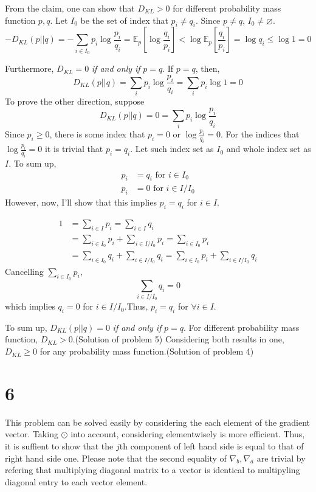 \documentclass[10pt]{article}
\begin{document}
From the claim, one can show that $D_{KL}>0$ for different probability mass function $p, q$. Let $I_0$ be the set of index that $p_i \neq q_i$. Since $p\neq q$, $I_0 \neq \varnothing$.
\begin{equation}
    -D_{KL}(p||q) = -\sum_{i\in I_0} p_i\log{\frac{p_i}{q_i}} = \mathbb{E}_{p}\left[\log{\frac{q_i}{p_i}}\right] < \log{\mathbb{E}_p\left[\frac{q_i}{p_i}\right]} = \log q_i \le \log 1 = 0 
    \label{eqn8}
\end{equation}

Furthermore, $D_{KL}=0$ \textit{if and only if} $p = q$. If $p=q$, then, 
\begin{equation}
    D_{KL}(p||q) = \sum_i p_i \log{\frac{p_i}{q_i}} = \sum_i p_i \log{1} = 0
\end{equation}
To prove the other direction, suppose
\begin{equation}
    D_{KL}(p||q) = 0 = \sum_i p_i \log{\frac{p_i}{q_i}}
\end{equation}
Since $p_i\ge 0$, there is some index that $p_i = 0$ or $\log{\frac{p_i}{q_i}} = 0$. For the indices that $\log{\frac{p_i}{q_i}} = 0$
it is trivial that $p_i = q_i$. Let such index set as $I_0$ and whole index set as $I$. To sum up,
\begin{align*}
    p_i &= q_i \text{ for } i \in I_0 \\
    p_i &= 0 \text{ for } i \in I/I_0
\end{align*}
However, now, I'll show that this implies $p_i = q_i$ for $i \in I$.

\begin{align*}
    1 &= \sum_{i\in I } p_i = \sum_{i\in I}q_i \\
    &= \sum_{i\in I_0} p_i + \sum_{i \in I/I_0} p_i = \sum_{i\in I_0} p_i \\
    &= \sum_{i\in I_0} q_i + \sum_{i \in I/I_0} q_i = \sum_{i \in I_0} p_i + \sum_{i \in I/I_0} q_i
\end{align*}
Cancelling $\sum_{i\in I_0} p_i$, 
\begin{equation}
    \sum_{i\in I/I_0} q_i = 0
\end{equation}
which implies $q_i = 0$ for $i\in I/I_0$.Thus, $p_i = q_i$ for $\forall i \in I$.

To sum up, $D_{KL}(p||q) = 0$ \textit{if and only if} $p = q$. For different probability mass function, $D_{KL} > 0$.(Solution of problem 5)
Considering both results in one, $D_{KL} \ge 0$ for any probability mass function.(Solution of problem 4) 

\section*{6}
This problem can be solved easily by considering the each element of the gradient vector. Taking $\odot$ into account, considering elementwisely is more efficient. Thus, it is suffient to show that the $j$th component of left hand side is equal to that of right hand side one. Please note that the second equality of $\nabla_b, \nabla_a$ are trivial by refering that multiplying diagonal matrix to a vector is identical to multipyling diagonal entry to each vector element. 
\end{document}
